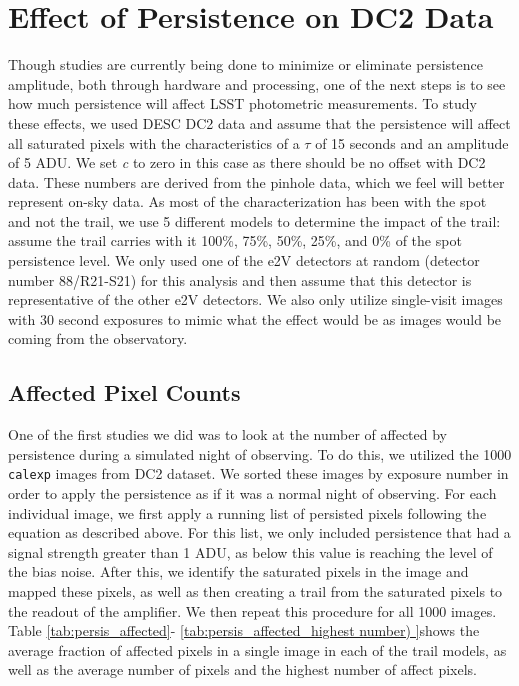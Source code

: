 \documentclass[DM,authoryear,toc]{lsstdoc}
\begin{document}
\section{Effect of Persistence on DC2 Data}

Though studies are currently being done to minimize or eliminate persistence amplitude, both through hardware and processing, one of the next steps is to see how much persistence will affect LSST photometric measurements.
To study these effects, we used DESC DC2 data and assume that the persistence will affect all saturated pixels with the characteristics of a \textit{$\tau$} of 15 seconds and an amplitude of 5 ADU\@.
We set \textit{c} to zero in this case as there should be no offset with DC2 data.
These numbers are derived from the pinhole data, which we feel will better represent on-sky data.
As most of the characterization has been with the spot and not the trail, we use 5 different models to determine the impact of the trail: assume the trail carries with it 100\%, 75\%, 50\%, 25\%, and 0\% of the spot persistence level.
We only used one of the e2V detectors at random (detector number 88/R21-S21) for this analysis and then assume that this detector is representative of the other e2V detectors.
We also only utilize single-visit images with 30 second exposures to mimic what the effect would be as images would be coming from the observatory.

\subsection{Affected Pixel Counts}

One of the first studies we did was to look at the number of affected by persistence during a simulated night of observing.
To do this, we utilized the 1000 \texttt{calexp} images from DC2 dataset. 
We sorted these images by exposure number in order to apply the persistence as if it was a normal night of observing.
For each individual image, we first apply a running list of persisted pixels following the equation as described above.
For this list, we only included persistence that had a signal strength greater than 1 ADU, as below this value is reaching the level of the bias noise.
After this, we identify the saturated pixels in the image and mapped these pixels, as well as then creating a trail from the saturated pixels to the readout of the amplifier.
We then repeat this procedure for all 1000 images.
Table \ref{tab:persis_affected}- \ref{tab:persis_affected_highest number) }shows the average fraction of affected pixels in a single image in each of the trail models, as well as the average number of pixels and the highest number of affect pixels.
\end{document}
